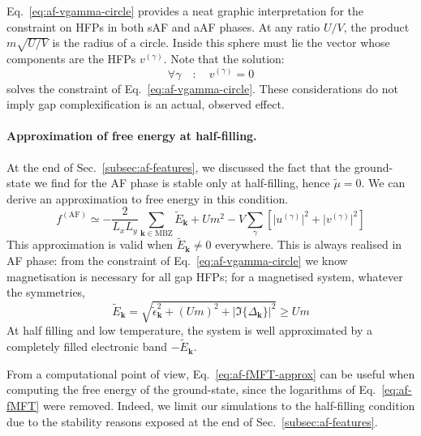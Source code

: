 Eq.~\eqref{eq:af-vgamma-circle} provides a neat graphic interpretation for the constraint on HFPs in both sAF and aAF phases. At any ratio $U/V$, the product $m \sqrt{U/V}$ is the radius of a circle. Inside this sphere must lie the vector whose components are the HFPs $v^{(\gamma)}$. Note that the solution:
\[
	\forall \gamma
	\quad\colon\quad
	v^{(\gamma)} = 0
\]
solves the constraint of Eq.~\eqref{eq:af-vgamma-circle}. These considerations do not imply gap complexification is an actual, observed effect.

\paragraph{Approximation of free energy at half-filling.}

At the end of Sec.~\ref{subsec:af-features}, we discussed the fact that the ground-state we find for the AF phase is stable only at half-filling, hence $\tilde{\mu}=0$. We can derive an approximation to free energy in this condition.
\begin{equation}\label{eq:af-fMFT-approx}
	f^{(\mathrm{AF})} \simeq -\frac{2}{L_x L_y} \sum_{\mathbf{k}\in\mathrm{MBZ}} \tilde{E}_\mathbf{k} + U m^2 - V \sum_{\gamma} \left[
	\big|u^{(\gamma)}\big|^2 + \big|v^{(\gamma)}\big|^2
	\right]
\end{equation}
This approximation is valid when $\tilde{E}_\mathbf{k} \neq 0$ everywhere. This is always realised in AF phase: from the constraint of Eq.~\eqref{eq:af-vgamma-circle} we know magnetisation is necessary for all gap HFPs; for a magnetised system, whatever the symmetries,
\[
	\tilde{E}_\mathbf{k} = \sqrt{\tilde{\epsilon}_\mathbf{k}^2 + (Um)^2 + \big| \Im\lbrace \Delta_\mathbf{k} \rbrace \big|^2} \ge Um
\]
At half filling and low temperature, the system is well approximated by a completely filled electronic band $-\tilde{E}_\mathbf{k}$.

From a computational point of view, Eq.~\eqref{eq:af-fMFT-approx} can be useful when computing the free energy of the ground-state, since the logarithms of Eq.~\eqref{eq:af-fMFT} were removed. Indeed, we limit our simulations to the half-filling condition due to the stability reasons exposed at the end of Sec.~\ref{subsec:af-features}.

